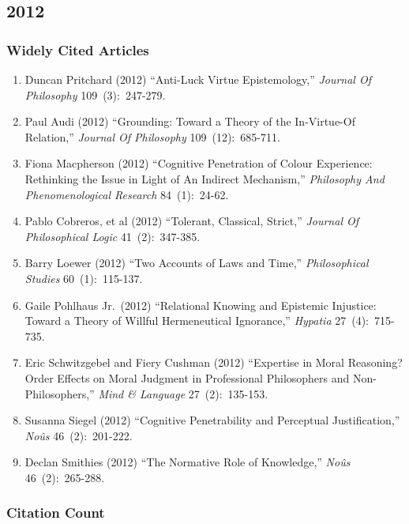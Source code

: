 \documentclass[
  10pt,
  letterpaper,
  DIV=11,
  numbers=noendperiod,
  twoside]{scrartcl}
\providecommand{\tightlist}{%
  \setlength{\itemsep}{0pt}\setlength{\parskip}{0pt}}\usepackage{longtable,booktabs,array}
\begin{document}
\newpage

\subsection{2012}\label{sec-s2012}

\subsubsection*{Widely Cited Articles}\label{widely-cited-articles-55}

\begin{enumerate}
\def\labelenumi{\arabic{enumi}.}
\tightlist
\item
  Duncan Pritchard (2012) ``Anti-Luck Virtue Epistemology,''
  \emph{Journal Of Philosophy} 109~(3):~247-279.
\item
  Paul Audi (2012) ``Grounding: Toward a Theory of the In-Virtue-Of
  Relation,'' \emph{Journal Of Philosophy} 109~(12):~685-711.
\item
  Fiona Macpherson (2012) ``Cognitive Penetration of Colour Experience:
  Rethinking the Issue in Light of An Indirect Mechanism,''
  \emph{Philosophy And Phenomenological Research} 84~(1):~24-62.
\item
  Pablo Cobreros, et al (2012) ``Tolerant, Classical, Strict,''
  \emph{Journal Of Philosophical Logic} 41~(2):~347-385.
\item
  Barry Loewer (2012) ``Two Accounts of Laws and Time,''
  \emph{Philosophical Studies} 60~(1):~115-137.
\item
  Gaile Pohlhaus Jr.~(2012) ``Relational Knowing and Epistemic
  Injustice: Toward a Theory of Willful Hermeneutical Ignorance,''
  \emph{Hypatia} 27~(4):~715-735.
\item
  Eric Schwitzgebel and Fiery Cushman (2012) ``Expertise in Moral
  Reasoning? Order Effects on Moral Judgment in Professional
  Philosophers and Non-Philosophers,'' \emph{Mind \& Language}
  27~(2):~135-153.
\item
  Susanna Siegel (2012) ``Cognitive Penetrability and Perceptual
  Justification,'' \emph{Noûs} 46~(2):~201-222.
\item
  Declan Smithies (2012) ``The Normative Role of Knowledge,''
  \emph{Noûs} 46~(2):~265-288.
\end{enumerate}

\subsubsection*{Citation Count}\label{sec-count-2012}
\end{document}
